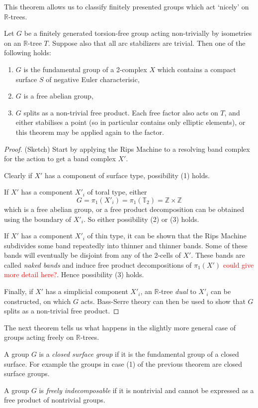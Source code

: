 This theorem allows us to classify finitely presented groups which act `nicely' on $\mathbb{R}$-trees.
\begin{theorem}\label{rtreesclassification}
    Let $G$ be a finitely generated torsion-free group acting non-trivially by isometries on an $\mathbb{R}$-tree $T$. Suppose also that all arc stabilizers are trivial. Then one of the following holds:
    \begin{enumerate}
        \item $G$ is the fundamental group of a 2-complex $X$ which contains a compact surface $S$ of negative Euler characterisic,
        \item $G$ is a free abelian group,
        \item $G$ splits as a non-trivial free product. Each free factor also acts on $T$, and either stabilises a point (so in particular contains only elliptic elements), or this theorem may be applied again to the factor.
    \end{enumerate}
\end{theorem}
\begin{proof} (Sketch)
    Start by applying the Rips Machine to a resolving band complex for the action to get a band complex $X'$. 

    Clearly if $X'$ has a component of surface type, possibility (1) holds.

    If $X'$ has a component $X'_i$ of toral type, either \[G=\pi_1(X'_i)=\pi_1(\mathbb{T}_2)=\mathbb{Z}\times\mathbb{Z}\] which is a free abelian group, or a free product decomposition can be obtained using the boundary of $X'_i$. So either possibility (2) or (3) holds. 

    If $X'$ has a component $X'_i$ of thin type, it can be shown that the Rips Machine subdivides some band repeatedly into thinner and thinner bands. Some of these bands will eventually be disjoint from any of the 2-cells of $X'$. These bands are called \textit{naked bands} and induce free product decompositions of $\pi_1(X')$ \textcolor{red}{could give more detail here?}. Hence possibility (3) holds.

    Finally, if $X'$ has a simplicial component $X'_i$, an $\mathbb{R}$-tree \textit{dual} to $X'_i$ can be constructed, on which $G$ acts. Bass-Serre theory can then be used to show that $G$ splits as a non-trivial free product.
\end{proof}

The next theorem tells us what happens in the slightly more general case of groups acting freely on $\mathbb{R}$-trees.
\begin{definition}
    A group $G$ is a \emph{closed surface group} if it is the fundamental group of a closed surface. For example the groups in case (1) of the previous theorem are closed surface groups.
\end{definition}
\begin{definition}
    A group $G$ is \emph{freely indecomposable} if it is nontrivial and cannot be expressed as a free product of nontrivial groups.
\end{definition}

